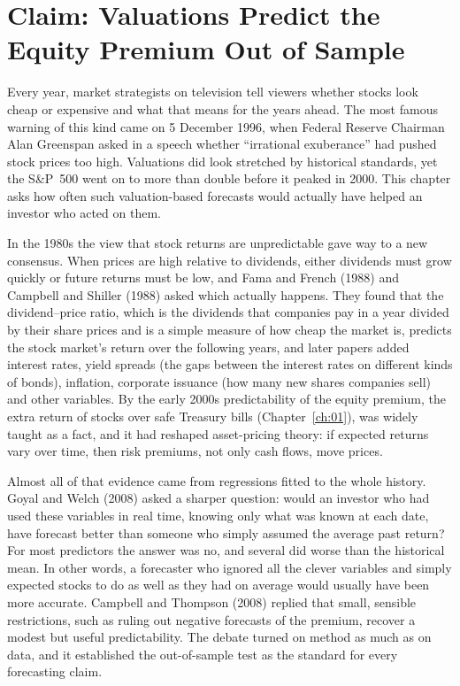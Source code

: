 \makeatletter
\makeatother

\chapter{Claim: Valuations Predict the Equity Premium Out of Sample}
\label{ch:06}

Every year, market strategists on television tell viewers whether stocks look cheap or expensive and what that means for the years ahead. The most famous warning of this kind came on 5 December 1996, when Federal Reserve Chairman Alan Greenspan asked in a speech whether ``irrational exuberance'' had pushed stock prices too high. Valuations did look stretched by historical standards, yet the S\&P~500 went on to more than double before it peaked in 2000. This chapter asks how often such valuation-based forecasts would actually have helped an investor who acted on them.

In the 1980s the view that stock returns are unpredictable gave way to a new consensus. When prices are high relative to dividends, either dividends must grow quickly or future returns must be low, and Fama and French (1988) and Campbell and Shiller (1988) asked which actually happens. They found that the dividend--price ratio, which is the dividends that companies pay in a year divided by their share prices and is a simple measure of how cheap the market is, predicts the stock market's return over the following years, and later papers added interest rates, yield spreads (the gaps between the interest rates on different kinds of bonds), inflation, corporate issuance (how many new shares companies sell) and other variables. By the early 2000s predictability of the equity premium, the extra return of stocks over safe Treasury bills (Chapter~\ref{ch:01}), was widely taught as a fact, and it had reshaped asset-pricing theory: if expected returns vary over time, then risk premiums, not only cash flows, move prices.

Almost all of that evidence came from regressions fitted to the whole history. Goyal and Welch (2008) asked a sharper question: would an investor who had used these variables in real time, knowing only what was known at each date, have forecast better than someone who simply assumed the average past return? For most predictors the answer was no, and several did worse than the historical mean. In other words, a forecaster who ignored all the clever variables and simply expected stocks to do as well as they had on average would usually have been more accurate. Campbell and Thompson (2008) replied that small, sensible restrictions, such as ruling out negative forecasts of the premium, recover a modest but useful predictability. The debate turned on method as much as on data, and it established the out-of-sample test as the standard for every forecasting claim.

